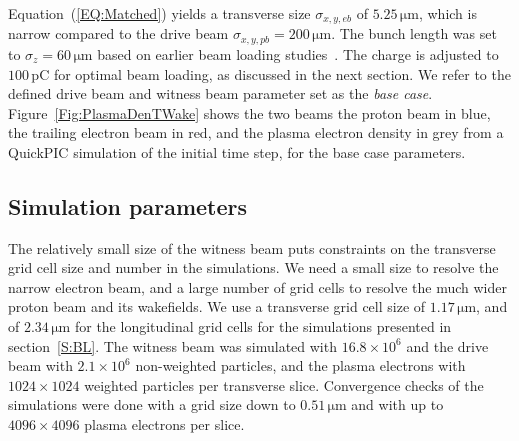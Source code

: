 \documentclass[aps,prstab,reprint,amsmath,amssymb,groupedaddress]{revtex4-1}
\newcommand{\unit}[1]{\,\mathrm{#1}}
\newcommand{\nexp}[1]{\times 10^{#1}}
\begin{document}
Equation~(\ref{EQ:Matched}) yields a transverse size $\sigma_{x,y,eb}$ of $5.25\unit{\mu m}$, which is narrow compared to the drive beam $\sigma_{x,y,pb} = 200\unit{\mu m}$. The bunch length was set to $\sigma_{z} = 60\unit{\mu m}$ based on earlier beam loading studies~\cite{berglyd_olsen:2016}. The charge is adjusted to $100\unit{pC}$ for optimal beam loading, as discussed in the next section. We refer to the defined drive beam and witness beam parameter set as the \emph{base case}. Figure~\ref{Fig:PlasmaDenTWake} shows the two beams \textendash the proton beam in blue, the trailing electron beam in red, and the plasma electron density in grey \textendash from a QuickPIC simulation of the initial time step, for the base case parameters.

\subsection{Simulation parameters}\label{SIM}

The relatively small size of the witness beam puts constraints on the transverse grid cell size and number in the simulations. We need a small size to resolve the narrow electron beam, and a large number of grid cells to resolve the much wider proton beam and its wakefields. We use a transverse grid cell size of $1.17\unit{\mu m}$, and of $2.34\unit{\mu m}$ for the longitudinal grid cells for the simulations presented in section~\ref{S:BL}. The witness beam was simulated with $16.8\nexp{6}$ and the drive beam with $2.1\nexp{6}$ non-weighted particles, and the plasma electrons with $1024 \times 1024$ weighted particles per transverse slice. Convergence checks of the simulations were done with a grid size down to $0.51\unit{\mu m}$ and with up to $4096 \times 4096$ plasma electrons per slice.
\end{document}

